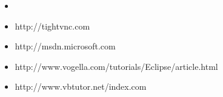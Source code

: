 
\label{Bibliography}

 \begin{itemize}
  \item 
  \item http://tightvnc.com
  \item http://msdn.microsoft.com
  \item http://www.vogella.com/tutorials/Eclipse/article.html
  \item http://www.vbtutor.net/index.com
  \end{itemize}




